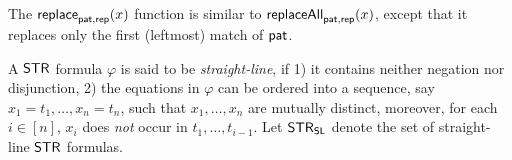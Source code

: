 The $\mathsf{replace}_{\mathsf{pat}, \mathsf{rep}}(x)$ function is similar to $\mathsf{replaceAll}_{\mathsf{pat}, \mathsf{rep}}(x)$, except that it replaces only the first (leftmost) match of $\mathsf{pat}$.

A $\mathsf{STR}$ formula $\varphi$ is said to be \emph{straight-line}, if 1) it contains neither negation nor disjunction, 2) the equations in $\varphi$ can be ordered into a sequence, say $x_1 = t_1, \ldots, x_n = t_n$, such that $x_1,\ldots, x_n$ are mutually distinct, moreover, for each $i \in [n]$, $x_i$ does \emph{not} occur in $t_1, \ldots, t_{i-1}$. Let $\mathsf{STR}_{\mathsf{SL}}$ denote the set of straight-line $\mathsf{STR}$ formulas.

%
%
%
%
%
%
